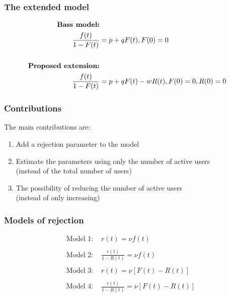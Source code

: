 \documentclass{beamer}
\begin{document}
\begin{frame}
\frametitle{The extended model}
\begin{align*}
\text{\textbf{Bass model:}} \\
\frac{f(t)}{1-F(t)} &= p + qF(t), F(0)=0 \\
\\
\text{\textbf{Proposed extension:}} \\
\frac{f(t)}{1-F(t)} &= p + qF(t) - wR(t), F(0)=0, R(0)=0
\end{align*}
\end{frame}


\begin{frame}
\frametitle{Contributions}
The main contributions are:
\begin{enumerate}[i]
\item Add a rejection parameter to the model
\item Estimate the parameters using only the number of active users \\(instead of the total number of users)
\item The possibility of reducing the number of active users \\(instead of only increasing)
\end{enumerate}
\end{frame}


\begin{frame}
\frametitle{Models of rejection}
\begin{align*}
	\text{Model 1: }& r(t) = \nu f(t) \\
    \\
	\text{Model 2: }& \frac{r(t)}{1-R(t)} = \nu f(t) \\
    \\
	\text{Model 3: }& r(t) = \nu [F(t) - R(t)] \\
    \\
	\text{Model 4: }& \frac{r(t)}{1-R(t)} = \nu [F(t) - R(t)]
\end{align*}
\end{frame}
\end{document}
